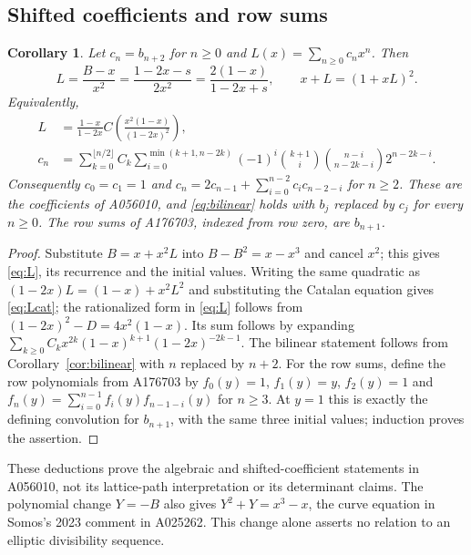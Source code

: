 \documentclass[11pt]{article}
\newtheorem{corollary}[theorem]{Corollary}
\begin{document}
\subsection{Shifted coefficients and row sums}

\begin{corollary}\label{cor:shifts}
Let $c_n=b_{n+2}$ for $n\geq0$ and
$L(x)=\sum_{n\geq0}c_nx^n$. Then
\begin{equation}\label{eq:L}
 L=\frac{B-x}{x^2}=\frac{1-2x-s}{2x^2}
  =\frac{2(1-x)}{1-2x+s},\qquad
 x+L=(1+xL)^2.
\end{equation}
Equivalently,
\begin{equation}\label{eq:Lcat}
\begin{split}
 L&=\frac{1-x}{1-2x}
 C\left(\frac{x^2(1-x)}{(1-2x)^2}\right),\\
 c_n&=\sum_{k=0}^{\lfloor n/2\rfloor}C_k
 \sum_{i=0}^{\min(k+1,n-2k)}
 (-1)^i\binom{k+1}{i}\binom{n-i}{n-2k-i}2^{n-2k-i}.
\end{split}
\end{equation}
Consequently $c_0=c_1=1$ and
$c_n=2c_{n-1}+\sum_{i=0}^{n-2}c_i c_{n-2-i}$ for $n\geq2$.
These are the coefficients of A056010, and \eqref{eq:bilinear}
holds with $b_j$ replaced by $c_j$ for every $n\geq0$.
The row sums of A176703, indexed from row zero, are $b_{n+1}$.
\end{corollary}
\begin{proof}
Substitute $B=x+x^2L$ into $B-B^2=x-x^3$ and cancel $x^2$;
this gives \eqref{eq:L}, its recurrence and the initial values.
Writing the same quadratic as
$(1-2x)L=(1-x)+x^2L^2$ and substituting the Catalan equation
gives \eqref{eq:Lcat}; the rationalized form in \eqref{eq:L}
follows from $(1-2x)^2-D=4x^2(1-x)$. Its sum follows by expanding
$\sum_{k\geq0}C_kx^{2k}(1-x)^{k+1}(1-2x)^{-2k-1}$.
The bilinear statement follows from Corollary~\ref{cor:bilinear}
with $n$ replaced by $n+2$.
For the row sums, define the row polynomials from A176703
\cite{oeist} by $f_0(y)=1$, $f_1(y)=y$, $f_2(y)=1$ and
$f_n(y)=\sum_{i=0}^{n-1}f_i(y)f_{n-1-i}(y)$ for $n\geq3$.
At $y=1$ this is exactly the defining convolution for $b_{n+1}$,
with the same three initial values; induction proves the assertion.
\end{proof}

These deductions prove the algebraic and shifted-coefficient statements
in A056010, not its lattice-path interpretation or its determinant
claims. The polynomial change $Y=-B$ also gives
$Y^2+Y=x^3-x$, the curve equation in Somos's 2023 comment in A025262.
This change alone asserts no relation to an elliptic divisibility sequence.
\end{document}
